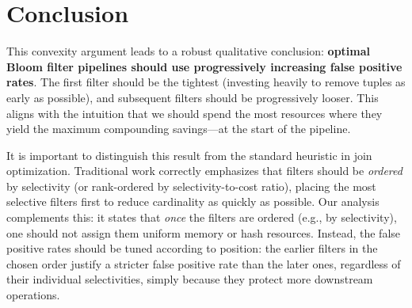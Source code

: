 \documentclass{article}
\begin{document}
\section{Conclusion}
This convexity argument leads to a robust qualitative conclusion: \textbf{optimal Bloom filter pipelines should use progressively increasing false positive rates}.
The first filter should be the tightest (investing heavily to remove tuples as early as possible), and subsequent filters should be progressively looser. This aligns with the intuition that we should spend the most resources where they yield the maximum compounding savings—at the start of the pipeline.

It is important to distinguish this result from the standard heuristic in join optimization. Traditional work correctly emphasizes that filters should be \emph{ordered} by selectivity (or rank-ordered by selectivity-to-cost ratio), placing the most selective filters first to reduce cardinality as quickly as possible.
Our analysis complements this: it states that \emph{once} the filters are ordered (e.g., by selectivity), one should not assign them uniform memory or hash resources. Instead, the false positive rates should be tuned according to position: the earlier filters in the chosen order justify a stricter false positive rate than the later ones, regardless of their individual selectivities, simply because they protect more downstream operations.
\end{document}
